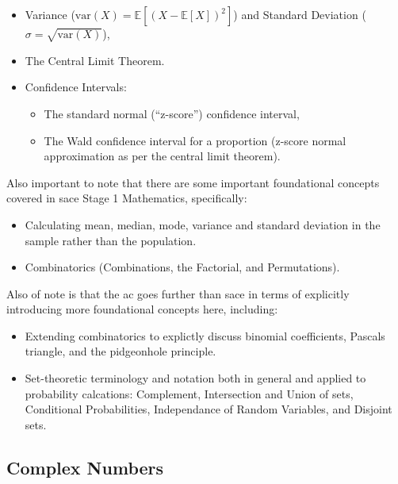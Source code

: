 \documentclass[twoside,12pt,a4paper]{report}
\begin{document}
\begin{itemize}
	\item Variance ($\text{var}(X) = \mathbb{E}\left[(X - \mathbb{E}[X])^2\right]$) and Standard Deviation ($\sigma = \sqrt{\text{var}(X)}$), 
	\item The Central Limit Theorem.
	\item Confidence Intervals: 
		\begin{itemize}
			\item The standard normal (``z-score'') confidence interval,
			\item The Wald confidence interval for a proportion (z-score normal approximation as per the central limit theorem).
		\end{itemize}
\end{itemize}

Also important to note that there are some important foundational concepts covered in \gls{sace} Stage 1 Mathematics, specifically:
\begin{itemize}
	\item Calculating mean, median, mode, variance and standard deviation in the sample rather than the population.
	\item Combinatorics (Combinations, the Factorial, and Permutations).
\end{itemize}

Also of note is that the \gls{ac} goes further than \gls{sace} in terms of explicitly introducing more foundational concepts here, including: 
\begin{itemize}
	\item Extending combinatorics to explictly discuss binomial coefficients, Pascals triangle, and the pidgeonhole principle.
	\item Set-theoretic terminology and notation both in general and applied to probability calcations: Complement, Intersection and Union of sets, Conditional Probabilities, Independance of Random Variables, and Disjoint sets.
\end{itemize}

\subsection{Complex Numbers}
\end{document}
